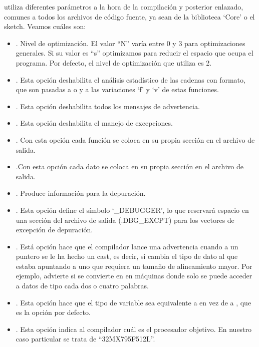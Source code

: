  utiliza diferentes parámetros a la hora de la compilación y posterior enlazado, comunes a todos los archivos de código fuente, ya sean de la biblioteca `Core' o el sketch. Veamos cuáles son:

\begin{itemize}
    \item {}. Nivel de optimización. El valor ``N'' varía entre 0 y 3 para optimizaciones generales. Si su valor es ``s'' optimizamos para reducir el espacio que ocupa el programa. Por defecto, el nivel de optimización que utiliza  es 2.
    \item {}. Esta opción deshabilita el análisis estadístico de las cadenas con formato, que son pasadas a  o  y a las variaciones `f' y `v' de estas funciones.
    \item {}. Esta opción deshabilita todos los mensajes de advertencia.
    \item {}. Esta opción deshabilita el manejo de excepciones.
    \item {}. Con esta opción cada función se coloca en su propia sección en el archivo de salida.
    \item {}.Con esta opción cada dato se coloca en su propia sección en el archivo de salida.
    \item {}. Produce información para la depuración.
    \item {}. Esta opción define el símbolo `\_DEBUGGER', lo que reservará espacio en una sección del archivo de salida (.DBG\_EXCPT) para los vectores de excepción de depuración.
    \item {}. Está opción hace que el compilador lance una advertencia cuando a un puntero se le ha hecho un cast, es decir, si cambia el tipo de dato al que estaba apuntando a uno que requiera un tamaño de alineamiento mayor. Por ejemplo, advierte si  se convierte en  en máquinas donde solo se puede acceder a datos de tipo cada dos o cuatro palabras.
    \item {}. Esta opción hace que el tipo de variable  sea equivalente a  en vez de a , que es la opción por defecto.
    \item {}. Esta opción indica al compilador cuál es el procesador objetivo. En nuestro caso particular se trata de ``32MX795F512L''.

\end{itemize}
